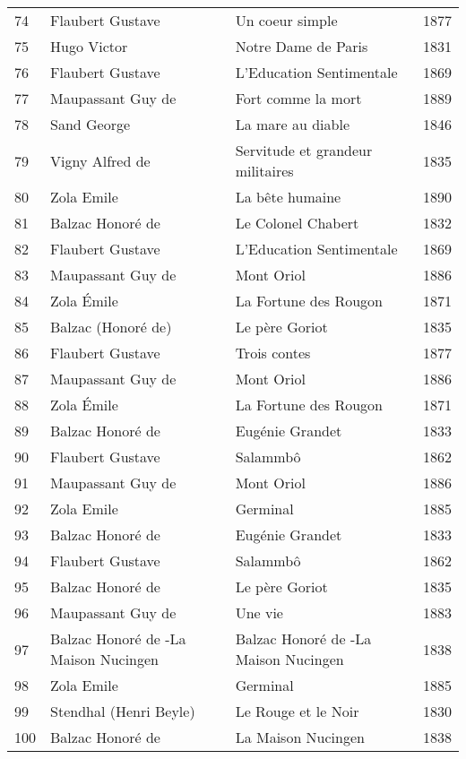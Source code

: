 \begin{table}[H]
\begin{tabular}{l l l l}
    74 & Flaubert Gustave & Un coeur simple & 1877 \\
    75 & Hugo Victor & Notre Dame de Paris & 1831 \\
    76 & Flaubert Gustave & L'Education Sentimentale & 1869 \\
    77 & Maupassant Guy de & Fort comme la mort & 1889 \\
    78 & Sand George & La mare au diable & 1846 \\
    79 & Vigny Alfred de & Servitude et grandeur militaires & 1835 \\
    80 & Zola Emile & La bête humaine & 1890 \\
    81 & Balzac Honoré de & Le Colonel Chabert & 1832 \\
    82 & Flaubert Gustave & L'Education Sentimentale & 1869 \\
    83 & Maupassant Guy de & Mont Oriol & 1886 \\
    84 & Zola Émile & La Fortune des Rougon & 1871 \\
    85 & Balzac (Honoré de) & Le père Goriot & 1835 \\
    86 & Flaubert Gustave & Trois contes & 1877 \\
    87 & Maupassant Guy de & Mont Oriol & 1886 \\
    88 & Zola Émile & La Fortune des Rougon & 1871 \\
    89 & Balzac Honoré de & Eugénie Grandet & 1833 \\
    90 & Flaubert Gustave & Salammbô & 1862 \\
    91 & Maupassant Guy de & Mont Oriol & 1886 \\
    92 & Zola Emile & Germinal & 1885 \\
    93 & Balzac Honoré de & Eugénie Grandet & 1833 \\
    94 & Flaubert Gustave & Salammbô & 1862 \\
    95 & Balzac Honoré de & Le père Goriot & 1835 \\
    96 & Maupassant Guy de & Une vie & 1883 \\
    97 & Balzac Honoré de -La Maison Nucingen & Balzac Honoré de -La Maison Nucingen & 1838 \\
    98 & Zola Emile & Germinal & 1885 \\
    99 & Stendhal (Henri Beyle) & Le Rouge et le Noir & 1830 \\
    100 & Balzac Honoré de & La Maison Nucingen & 1838 \\
    \bottomrule
  \end{tabular}
\end{table}


